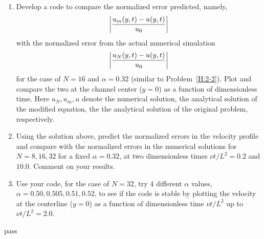 \begin{homework}[label={H:4-1}]
    \begin{enumerate}[label=(\alph*)]
        \item Develop a code to compare the normalized error predicted, namely,
            \begin{equation}\label{E:4-1-6}
                \abs{\frac{u_m(y, t) - u(y, t)}{u_0}}
            \end{equation}
            with the normalized error from the actual numerical simulation
            \begin{equation}\label{E:4-1-7}
                \abs{\frac{u_N(y, t) - u(y, t)}{u_0}}
            \end{equation}
            for the case of $N=16$ and $\alpha=0.32$ (similar to Problem~\ref{H:2-2}). Plot and compare the two at the channel center ($y=0$) as a function of dimensionless time. Here $u_N, u_m, u$ denote the numerical solution, the analytical solution of the modified equation, the the analytical solution of the original problem, respectively.
        \item Using the solution above, predict the normalized errors in the velocity profile and compare with the normalized errors in the numerical solutions for $N=8, 16, 32$ for a fixed $\alpha=0.32$, at two dimensionless times $\nu t/L^2=0.2$ and $10.0$. Comment on your results.
        \item Use your code, for the case of $N=32$, try 4 different $\alpha$ values, $\alpha=0.50, 0.505, 0.51, 0.52$, to see if the code is stable by plotting the velocity at the centerline ($y=0$) as a function of dimensionless time $\nu t/L^2$ up to $\nu t/L^2=2.0$.
    \end{enumerate}
\end{homework}

pass




